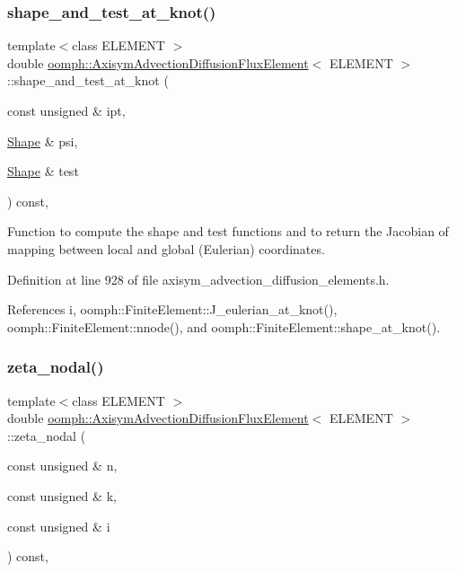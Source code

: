 \subsubsection{\texorpdfstring{shape\+\_\+and\+\_\+test\+\_\+at\+\_\+knot()}{shape\_and\_test\_at\_knot()}}
{\footnotesize\ttfamily template$<$class E\+L\+E\+M\+E\+NT $>$ \\
double \hyperlink{classoomph_1_1AxisymAdvectionDiffusionFluxElement}{oomph\+::\+Axisym\+Advection\+Diffusion\+Flux\+Element}$<$ E\+L\+E\+M\+E\+NT $>$\+::shape\+\_\+and\+\_\+test\+\_\+at\+\_\+knot (\begin{DoxyParamCaption}\item[{const unsigned \&}]{ipt,  }\item[{\hyperlink{classoomph_1_1Shape}{Shape} \&}]{psi,  }\item[{\hyperlink{classoomph_1_1Shape}{Shape} \&}]{test }\end{DoxyParamCaption}) const\hspace{0.3cm}{\ttfamily [inline]}, {\ttfamily [protected]}}



Function to compute the shape and test functions and to return the Jacobian of mapping between local and global (Eulerian) coordinates. 



Definition at line 928 of file axisym\+\_\+advection\+\_\+diffusion\+\_\+elements.\+h.



References i, oomph\+::\+Finite\+Element\+::\+J\+\_\+eulerian\+\_\+at\+\_\+knot(), oomph\+::\+Finite\+Element\+::nnode(), and oomph\+::\+Finite\+Element\+::shape\+\_\+at\+\_\+knot().

\mbox{\label{classoomph_1_1AxisymAdvectionDiffusionFluxElement_a889e0d213add699c8237bf4fbe10abfe}} 
\subsubsection{\texorpdfstring{zeta\+\_\+nodal()}{zeta\_nodal()}}
{\footnotesize\ttfamily template$<$class E\+L\+E\+M\+E\+NT $>$ \\
double \hyperlink{classoomph_1_1AxisymAdvectionDiffusionFluxElement}{oomph\+::\+Axisym\+Advection\+Diffusion\+Flux\+Element}$<$ E\+L\+E\+M\+E\+NT $>$\+::zeta\+\_\+nodal (\begin{DoxyParamCaption}\item[{const unsigned \&}]{n,  }\item[{const unsigned \&}]{k,  }\item[{const unsigned \&}]{i }\end{DoxyParamCaption}) const\hspace{0.3cm}{\ttfamily [inline]}, {\ttfamily [virtual]}}



